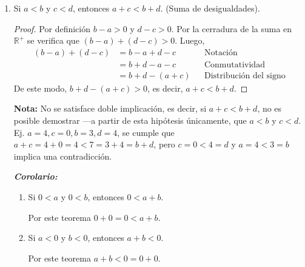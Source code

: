 \documentclass[11pt]{article}
\newcommand{\R}{\mathbb{R}}
\newcommand{\bfit}[1]{\textbf{\textit{#1}}}
\begin{document}
\begin{enumerate}[label=\alph*)]
    \item Si $a<b$ y $c < d$, entonces $a+c<b+d$. (Suma de desigualdades).
    \vspace{-1em}\begin{proof} 
        Por definición $b-a>0$ y $d-c>0$. Por la cerradura de la suma en $\R^+$ se verifica que $(b-a)+(d-c)>0$. Luego, \begin{align*}
            (b-a)+(d-c) &= b-a+d-c && \text{Notación}\\
            &= b+d-a-c && \text{Conmutatividad}\\
            &= b+d - (a+c) && \text{Distribución del signo}
            \end{align*}
        De este modo, $b+d-(a+c)>0$, es decir, $a+c<b+d$.    
    \end{proof} \vspace{-1em}
    \textbf{Nota:} No se satisface doble implicación, es decir, si $a+c<b+d$, no es posible demostrar —a partir de esta hipótesis únicamente, que $a<b$ y $c<d$. Ej. $a=4, c=0, b=3, d=4$, se cumple que $a+c=4+0=4<7=3+4=b+d$, pero $c=0<4=d$ y $a=4<3=b$ implica una contradicción.

    \bfit{Corolario:}\begin{enumerate}[label=\roman*)]
        \item Si $0<a$ y $0<b$, entonces $0<a+b$.
        
        Por este teorema $0+0=0<a+b$.

        \item Si $a<0$ y $b<0$, entonces $a+b<0$.
        
        Por este teorema $a+b<0=0+0$.


\end{enumerate}
\end{enumerate}
\end{document}
